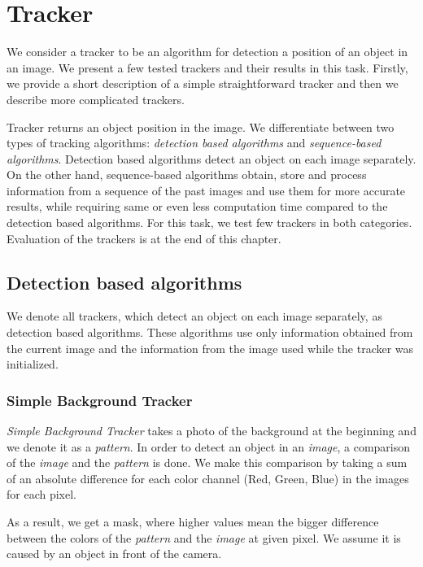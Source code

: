 \chapter{Tracker}

We consider a tracker to be an algorithm for detection a position of an object in
an image. We present a few tested trackers and their results in this task.
Firstly, we provide a short description of a simple straightforward tracker and
then we describe more complicated trackers.

Tracker returns an object position in the image. We differentiate between two
types of tracking algorithms: \emph{detection based algorithms} and
\emph{sequence-based algorithms}. Detection based algorithms detect an object
on each image separately. On the other hand, sequence-based algorithms obtain,
store and process information from a sequence of the past images and use them
for more accurate results, while requiring same or even less computation time
compared to the detection based algorithms. For this task, we test few trackers
in both categories. Evaluation of the trackers is at the end of this chapter.


\section {Detection based algorithms}

We denote all trackers, which detect an object on each image separately, as
detection based algorithms. These algorithms use only information obtained from
the current image and the information from the image used while the tracker was
initialized.

\subsection{Simple Background Tracker}

\emph{Simple Background Tracker} takes a photo of the background at the
beginning and we denote it as a \emph{pattern}. In order to detect an object in
an \emph{image}, a comparison of the \emph{image} and the \emph{pattern} is done.
We make this comparison by taking a sum of an absolute difference for each
color channel (Red, Green, Blue) in the images for each pixel.

As a result, we get a mask, where higher values mean the bigger difference between
the colors of the \emph{pattern} and the \emph{image} at given pixel. We assume it
is caused by an object in front of the camera.

